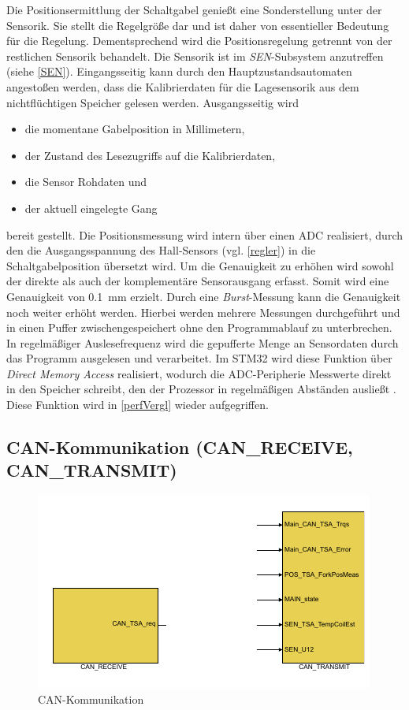 Die Positionsermittlung der Schaltgabel genießt eine Sonderstellung unter der Sensorik. Sie stellt die Regelgröße dar und ist daher von essentieller Bedeutung für die Regelung.  Dementsprechend wird die Positionsregelung getrennt von der restlichen Sensorik behandelt. Die Sensorik ist im \textit{SEN}-Subsystem anzutreffen (siehe \autoref{SEN}). Eingangsseitig kann durch den Hauptzustandsautomaten angestoßen werden, dass die Kalibrierdaten für die Lagesensorik aus dem nichtflüchtigen Speicher gelesen werden. Ausgangsseitig wird 
\begin{itemize}
	\item die momentane Gabelposition in Millimetern,
	\item der Zustand des Lesezugriffs auf die Kalibrierdaten,
	\item die Sensor Rohdaten und 
	\item der aktuell eingelegte Gang
\end{itemize}
bereit gestellt. 
Die Positionsmessung wird intern über einen ADC realisiert, durch den die Ausgangsspannung des Hall-Sensors (vgl. \autoref{regler}) in die Schaltgabelposition übersetzt wird. Um die Genauigkeit zu erhöhen wird sowohl der direkte als auch der komplementäre Sensorausgang erfasst. Somit wird eine Genauigkeit von \SI{0,1}{mm} erzielt. Durch eine \textit{Burst}-Messung kann die Genauigkeit noch weiter erhöht werden. Hierbei werden mehrere Messungen durchgeführt und in einen Puffer zwischengespeichert ohne den Programmablauf zu unterbrechen. In regelmäßiger Auslesefrequenz wird die gepufferte Menge an Sensordaten durch das Programm ausgelesen und verarbeitet. Im STM32 wird diese Funktion über \textit{Direct Memory Access} realisiert, wodurch die ADC-Peripherie Messwerte direkt in den Speicher schreibt, den der Prozessor in regelmäßigen Abständen ausließt \cite{stm32}. Diese Funktion wird in \autoref{perfVergl} wieder aufgegriffen.

\subsection{CAN-Kommunikation (CAN\_RECEIVE, CAN\_TRANSMIT)}

\begin{figure}[H]%
\centering
\includegraphics[width=0.6\columnwidth]{./Bilder/fig_can}%
\caption{CAN-Kommunikation}%
\label{fig_can}%
\end{figure}


